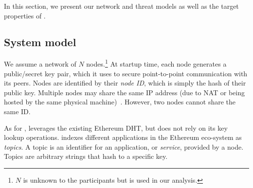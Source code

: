 

In this section, we present our network and threat models as well as the target properties of \sysname. 

\subsection{System model}

We assume a network of $N$ nodes.\footnote{$N$ is unknown to the participants but is used in our analysis.}
At startup time, each node generates a public/secret key pair, which it uses to secure point-to-point communication with its peers.
Nodes are identified by their \emph{node ID}, which is simply the hash of their public key.
Multiple nodes may share the same IP address (due to NAT or being hosted by the same physical machine)~\cite{marcus2018low}.
However, two nodes cannot share the same ID.


As for \discv, \sysname leverages the existing Ethereum DHT, but does not rely on its key lookup operations.
\sysname indexes different applications in the Ethereum eco-system as \emph{topics}.
A topic is an identifier for an application, or \emph{service}, provided by a node.
Topics are arbitrary strings that hash to a specific key. %

